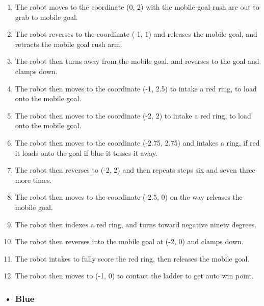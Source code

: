 \begin{enumerate}
    \item The robot moves to the coordinate (0, 2) with the mobile goal rush are out to grab to mobile goal.
    \item The robot reverses to the coordinate (-1, 1) and releases the mobile goal, and retracts the mobile goal rush arm. 
    \item The robot then turns away from the mobile goal, and reverses to the goal and clamps down.
    \item The robot then moves to the coordinate (-1, 2.5) to intake a red ring, to load onto the mobile goal.
    \item The robot then moves to the coordinate (-2, 2) to intake a red ring, to load onto the mobile goal.
    \item The robot then moves to the coordinate (-2.75, 2.75) and intakes a ring, if red it loads onto the goal if blue it tosses it away.
    \item The robot then reverses to (-2, 2) and then repeats steps six and seven three more times.
    \item The robot then moves to the coordinate (-2.5, 0) on the way releases the mobile goal.
    \item The robot then indexes a red ring, and turns toward negative ninety degrees.
    \item The robot then reverses into the mobile goal at (-2, 0) and clamps down.
    \item The robot intakes to fully score the red ring, then releases the mobile goal.
    \item The robot then moves to (-1, 0) to contact the ladder to get auto win point.
\end{enumerate}
\begin{itemize}
    \item \subsubsection{Blue}
\end{itemize}
